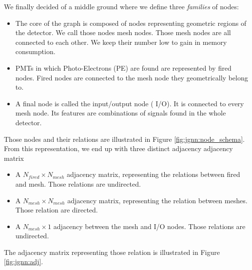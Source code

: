 \documentclass[../main.tex]{subfiles}
\begin{document}
We finally decided of a middle ground where we define three \textit{families} of nodes:
\begin{itemize}
  \item The core of the graph is composed of nodes representing geometric regions of the detector. We call those nodes {\color{Dandelion} mesh} nodes. Those mesh nodes are all connected to each other. We keep their number low to gain in memory consumption.
  \item PMTs in which Photo-Electrons (PE) are found are represented by {\color{red} fired} nodes. Fired nodes are connected to the mesh node they geometrically belong to.
  \item A final node is called the input/output node ({\color{blue} I/O}). It is connected to every mesh node.  Its features are combinations of signals found in the whole detector.
\end{itemize}

\hfill

Those nodes and their relations are illustrated in Figure \ref{fig:jgnn:node_schema}. From this representation, we end up with three distinct adjacency adjacency matrix
\begin{itemize}
  \item A $N_{fired} \times N_{mesh}$ adjacency matrix, representing the relations between fired and mesh. Those relations are undirected.
  \item A $N_{mesh} \times N_{mesh}$ adjacency matrix, representing the relation between meshes. Those relation are directed.
  \item A $N_{mesh} \times 1$ adjacency between the mesh and I/O nodes. Those relations are undirected.
\end{itemize}
The adjacency matrix representing those relation is illustrated in Figure \ref{fig:jgnn:adj}.
\end{document}
